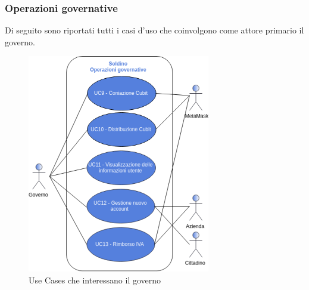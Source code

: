 \subsubsection*{Operazioni governative}
Di seguito sono riportati tutti i casi d'uso che coinvolgono come attore primario il governo.

\begin{figure}[H]
	\includegraphics[width=8cm]{res/images/UseCaseGoverno.png}
	\centering
	\caption{Use Cases che interessano il governo}
\end{figure}






